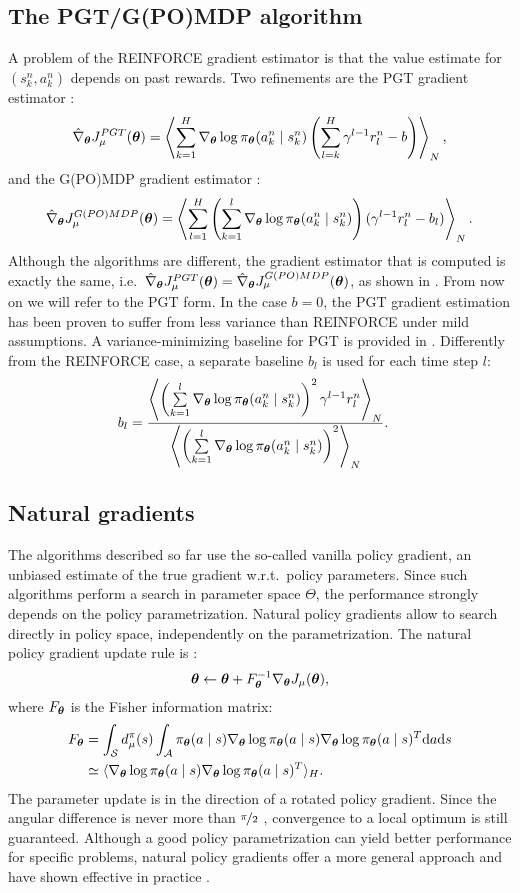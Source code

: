 \subsection{The PGT/G(PO)MDP algorithm}
A problem of the REINFORCE gradient estimator is that the value estimate for $(s_k^n,a_k^n)$ depends on past rewards. Two refinements are the PGT gradient estimator \cite{Sutton2000policy}:
\[
	\hat{\nabla}_{\boldsymbol{\theta}}J_{\mu}^{PGT}(\boldsymbol{\theta}) = 
		\left\langle
		\sum\limits_{k=1}^H\nabla_{\boldsymbol{\theta}}\log\pi_{\boldsymbol{\theta}}(a_k^n \mid s_k^n)
		\left(\sum\limits_{l=k}^H\gamma^{l-1}r_l^n-b\right)\right\rangle_N,
\]
and the G(PO)MDP gradient estimator \cite{Baxter2001infinite}:
\[
	\hat{\nabla}_{\boldsymbol{\theta}}J_{\mu}^{G(PO)MDP}(\boldsymbol{\theta}) = 
			\left\langle
			\sum\limits_{l=1}^H\left(\sum\limits_{k=1}^l
			\nabla_{\boldsymbol{\theta}}\log\pi_{\boldsymbol{\theta}}(a_k^n \mid s_k^n)\right)
			(\gamma^{l-1}r_l^n-b_l)\right\rangle_N.
\]
Although the algorithms are different, the gradient estimator that is computed is exactly the same, i.e.\ $\hat{\nabla}_{\boldsymbol{\theta}}J_{\mu}^{PGT}(\boldsymbol{\theta}) = \hat{\nabla}_{\boldsymbol{\theta}}J_{\mu}^{G(PO)MDP}(\boldsymbol{\theta})$, as shown in \cite{Peters2008reinf}. From now on we will refer to the PGT form.
In the case $b=0$, the PGT gradient estimation has been proven to suffer from less variance than REINFORCE \cite{Zhao2011a} under mild assumptions. A variance-minimizing baseline for PGT is provided in \cite{Peters2008reinf}. Differently from the REINFORCE case, a separate baseline $b_l$ is used for each time step $l$:
\begin{align*}
	b_l &= \frac{\left\langle\left(\sum\limits_{k=1}^l\nabla_{\boldsymbol{\theta}}\log\pi_{\boldsymbol{\theta}}(a_k^n \mid s_k^n)\right)^2
		\gamma^{l-1}r_l^n\right\rangle_N}
		{\left\langle\left(\sum\limits_{k=1}^l\nabla_{\boldsymbol{\theta}}\log\pi_{\boldsymbol{\theta}}(a_k^n \mid s_k^n)\right)^2
		\right\rangle_N}.
\end{align*}


\subsection{Natural gradients}
The algorithms described so far use the so-called vanilla policy gradient, \ie an unbiased estimate of the true gradient w.r.t.\ policy parameters.
Since such algorithms perform a search in parameter space $\Theta$, the performance strongly depends on the policy parametrization.
Natural policy gradients allow to search directly in policy space, independently on the parametrization. The natural policy gradient update rule is \cite{Kakade:2001}:
\[
	\boldsymbol{\theta} \gets \boldsymbol{\theta} + F_{\boldsymbol{\theta}}^{-1}\nabla_{\boldsymbol{\theta}}J_\mu(\boldsymbol{\theta}),
\]
where $F_{\boldsymbol{\theta}}$ is the Fisher information matrix:
\begin{align*}
	F_{\boldsymbol{\theta}} &= \int_{\mathcal{S}}d_{\mu}^{\pi}(s)
			\int_{\mathcal{A}}\pi_{\boldsymbol{\theta}}(a \mid s)\nabla_{\boldsymbol{\theta}}\log\pi_{\boldsymbol{\theta}}(a \mid s)
			\nabla_{\boldsymbol{\theta}}\log\pi_{\boldsymbol{\theta}}(a \mid s)^T\mathrm{d}a\mathrm{d}s \\
			&\simeq \langle\nabla_{\boldsymbol{\theta}}\log\pi_{\boldsymbol{\theta}}(a \mid s)\nabla_{\boldsymbol{\theta}}\log\pi_{\boldsymbol{\theta}}(a \mid s)^T\rangle_H.
\end{align*}
The parameter update is in the direction of a rotated policy gradient. Since the angular difference is never more than $\nicefrac{\pi}{2}$ \cite{Amari1998natural}, convergence to a local optimum is still guaranteed. 
Although a good policy parametrization can yield better performance for specific problems, natural policy gradients offer a more general approach and have shown effective in practice \cite{Peters2008natural}.

